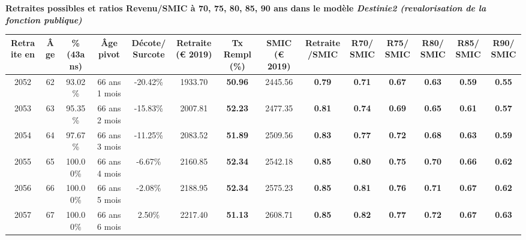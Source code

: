  \vspace{0.1cm} 
{\bf \noindent Retraites possibles et ratios Revenu/SMIC à 70, 75, 80, 85, 90 ans dans le modèle \emph{Destinie2 (revalorisation de la fonction publique)}}  
 
\begin{adjustbox}{max width=\textwidth} 
\begin{tabular}[htb]{|c|c||c|c|c||c|c||c|c||c|c|c|c|c|} 
\hline 
 Retraite en &  Âge &  \%(43ans) &  Âge pivot &  Décote/Surcote &  Retraite (\euro{} 2019) &  Tx Rempl(\%) &  SMIC (\euro{} 2019) &  Retraite/SMIC &  R70/SMIC &  R75/SMIC &  R80/SMIC &  R85/SMIC &  R90/SMIC \\ 
\hline \hline 
 2052 &  62 &  93.02\% &  66 ans 1 mois &  -20.42\% &  1933.70 &  {\bf 50.96} &  2445.56 &  {\bf {\color{red} 0.79}} &  {\bf {\color{red} 0.71}} &  {\bf {\color{red} 0.67}} &  {\bf {\color{red} 0.63}} &  {\bf {\color{red} 0.59}} &  {\bf {\color{red} 0.55}} \\ 
\hline 
 2053 &  63 &  95.35\% &  66 ans 2 mois &  -15.83\% &  2007.81 &  {\bf 52.23} &  2477.35 &  {\bf {\color{red} 0.81}} &  {\bf {\color{red} 0.74}} &  {\bf {\color{red} 0.69}} &  {\bf {\color{red} 0.65}} &  {\bf {\color{red} 0.61}} &  {\bf {\color{red} 0.57}} \\ 
\hline 
 2054 &  64 &  97.67\% &  66 ans 3 mois &  -11.25\% &  2083.52 &  {\bf 51.89} &  2509.56 &  {\bf {\color{red} 0.83}} &  {\bf {\color{red} 0.77}} &  {\bf {\color{red} 0.72}} &  {\bf {\color{red} 0.68}} &  {\bf {\color{red} 0.63}} &  {\bf {\color{red} 0.59}} \\ 
\hline 
 2055 &  65 &  100.00\% &  66 ans 4 mois &  -6.67\% &  2160.85 &  {\bf 52.34} &  2542.18 &  {\bf {\color{red} 0.85}} &  {\bf {\color{red} 0.80}} &  {\bf {\color{red} 0.75}} &  {\bf {\color{red} 0.70}} &  {\bf {\color{red} 0.66}} &  {\bf {\color{red} 0.62}} \\ 
\hline 
 2056 &  66 &  100.00\% &  66 ans 5 mois &  -2.08\% &  2188.95 &  {\bf 52.34} &  2575.23 &  {\bf {\color{red} 0.85}} &  {\bf {\color{red} 0.81}} &  {\bf {\color{red} 0.76}} &  {\bf {\color{red} 0.71}} &  {\bf {\color{red} 0.67}} &  {\bf {\color{red} 0.62}} \\ 
\hline 
 2057 &  67 &  100.00\% &  66 ans 6 mois &  2.50\% &  2217.40 &  {\bf 51.13} &  2608.71 &  {\bf {\color{red} 0.85}} &  {\bf {\color{red} 0.82}} &  {\bf {\color{red} 0.77}} &  {\bf {\color{red} 0.72}} &  {\bf {\color{red} 0.67}} &  {\bf {\color{red} 0.63}} \\ 
\hline 
\hline 
\end{tabular} 
\end{adjustbox} 
 
